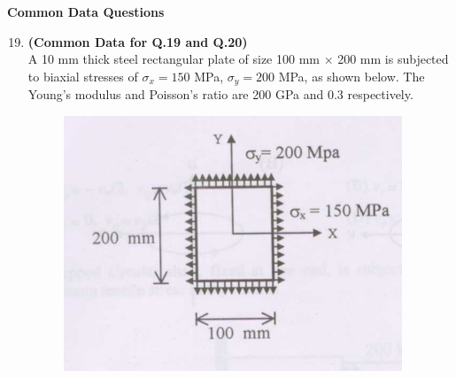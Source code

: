 \documentclass[journal,12pt,onecolumn]{IEEEtran}
\theoremstyle{remark}
\begin{document}
\Large\textbf{Common Data Questions}
 \begin{enumerate}
\setcounter{enumi}{18} 

\item[] \textbf{(Common Data for Q.19 and Q.20)}  \\
A 10 mm thick steel rectangular plate of size 100 mm $\times$ 200 mm is subjected to biaxial stresses of $\sigma_x = 150$ MPa, $\sigma_y = 200$ MPa, as shown below. The Young's modulus and Poisson's ratio are 200 GPa and 0.3 respectively.
\begin{figure}[h]
    \centering
    \includegraphics[width=0.5\columnwidth]{figs/fig24.png}
    
\end{figure}
\end{enumerate}
\end{document}
